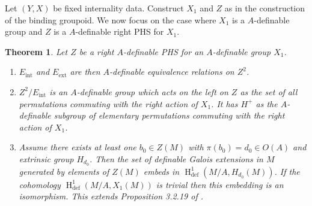 \documentclass{amsart}
\newtheorem{theorem}{Theorem}[section]
\theoremstyle{definition}
\theoremstyle{remark}
\numberwithin{equation}{section}
\def \defin {\operatorname{def}}
\def \HH {\operatorname{H}}
\begin{document}
Let $(Y,X)$ be fixed internality data. Construct $X_1$ and $Z$ as in the construction of the binding groupoid. We now focus on the case where $X_1$ is a $A$-definable group and $Z$ is a $A$-definable right PHS for $X_1$.

\begin{theorem}
    Let $Z$ be a right $A$-definable PHS for an $A$-definable group $X_1$. 
    \begin{enumerate}
        \item $E_{\text{int}}$ and $E_{\text{ext}}$ are then $A$-definable equivalence relations on $Z^2$. 
        \item $Z^2/E_{\text{int}}$ is an $A$-definable group which acts on the left on $Z$ as the set of all permutations commuting with the right action of $X_1$. It has $H^+$ as the $A$-definable subgroup of elementary permutations commuting with the right action of $X_1$.
        
        \item Assume there exists at least one $b_0 \in Z(M)$ with $\pi(b_0) = d_0 \in O(A)$ and extrinsic group $H_{d_0}$. Then the set of definable Galois  extensions in $M$ generated by elements of $Z(M)$ embeds in $\HH^{1}_{\defin}(M/A,H_{d_0}(M))$. If the cohomology $\HH^{1}_{\defin}(M/A,X_1(M))$ is trivial then this embedding is an isomorphism. This extends Proposition 3.2.19 of \cite{MeretzkyThesis}.
    \end{enumerate}
\end{theorem}
\end{document}
